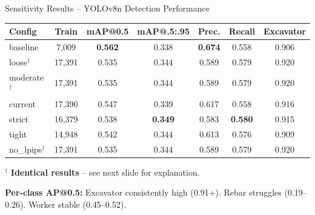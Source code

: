 \documentclass[aspectratio=169, 10pt]{beamer}
\begin{document}
\begin{frame}{Sensitivity Results -- YOLOv8n Detection Performance}
\centering
{\small
\begin{tabular}{l c c c c c c}
\toprule
\textbf{Config} & \textbf{Train} & \textbf{mAP@0.5} & \textbf{mAP@.5:.95} & \textbf{Prec.} & \textbf{Recall} & \textbf{Excavator} \\
\midrule
baseline          & 7,009  & \textbf{0.562} & 0.338 & \textbf{0.674} & 0.558 & 0.906 \\
\rowcolor{lightred}
loose$^\dagger$   & 17,391 & 0.535 & 0.344 & 0.589 & 0.579 & 0.920 \\
\rowcolor{lightred}
moderate$^\dagger$ & 17,391 & 0.535 & 0.344 & 0.589 & 0.579 & 0.920 \\
current           & 17,390 & 0.547 & 0.339 & 0.617 & 0.558 & 0.916 \\
strict            & 16,379 & 0.538 & \textbf{0.349} & 0.583 & \textbf{0.580} & 0.915 \\
tight             & 14,948 & 0.542 & 0.344 & 0.613 & 0.576 & 0.909 \\
\rowcolor{lightred}
no\_lpips$^\dagger$ & 17,391 & 0.535 & 0.344 & 0.589 & 0.579 & 0.920 \\
\bottomrule
\end{tabular}
}

\vspace{0.4em}
{\scriptsize $^\dagger$ \textcolor{warnred}{\textbf{Identical results}} -- see next slide for explanation.}

\vspace{0.3em}
\textbf{Per-class AP@0.5:}
{\scriptsize Excavator consistently high (0.91+). Rebar struggles (0.19--0.26). Worker stable (0.45--0.52).}
\end{frame}
\end{document}
